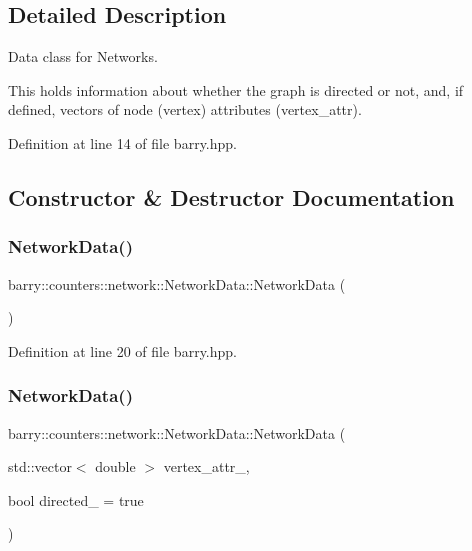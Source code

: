 \subsection{Detailed Description}
Data class for Networks. 

This holds information about whether the graph is directed or not, and, if defined, vectors of node (vertex) attributes ({\ttfamily vertex\+\_\+attr}). 

Definition at line 14 of file barry.\+hpp.



\subsection{Constructor \& Destructor Documentation}
\mbox{\label{classbarry_1_1counters_1_1network_1_1_network_data_a285d956b719012c5296aa537aca17fb2}} 
\subsubsection{\texorpdfstring{Network\+Data()}{NetworkData()}\hspace{0.1cm}{\footnotesize\ttfamily [1/3]}}
{\footnotesize\ttfamily barry\+::counters\+::network\+::\+Network\+Data\+::\+Network\+Data (\begin{DoxyParamCaption}{ }\end{DoxyParamCaption})\hspace{0.3cm}{\ttfamily [inline]}}



Definition at line 20 of file barry.\+hpp.

\mbox{\label{classbarry_1_1counters_1_1network_1_1_network_data_a6db461d607e95bc04dfb527f3422142d}} 
\subsubsection{\texorpdfstring{Network\+Data()}{NetworkData()}\hspace{0.1cm}{\footnotesize\ttfamily [2/3]}}
{\footnotesize\ttfamily barry\+::counters\+::network\+::\+Network\+Data\+::\+Network\+Data (\begin{DoxyParamCaption}\item[{std\+::vector$<$ double $>$}]{vertex\+\_\+attr\+\_\+,  }\item[{bool}]{directed\+\_\+ = {\ttfamily true} }\end{DoxyParamCaption})\hspace{0.3cm}{\ttfamily [inline]}}



